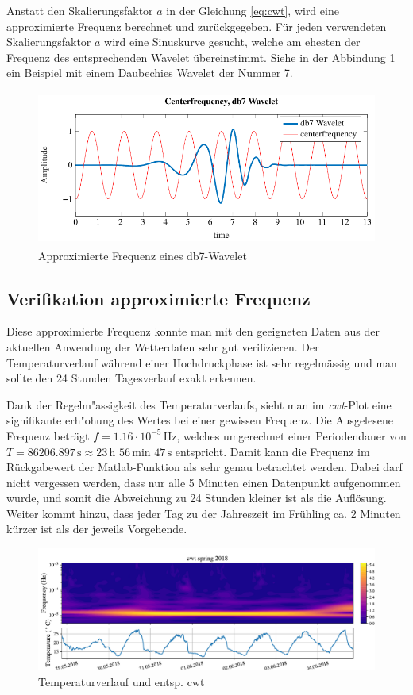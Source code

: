 \begin{refsection}
Anstatt den Skalierungsfaktor $a$ in der Gleichung \ref{eq:cwt}, wird eine approximierte Frequenz berechnet und zurückgegeben.
Für jeden verwendeten Skalierungsfaktor $a$ wird eine Sinuskurve gesucht, welche am ehesten der Frequenz des entsprechenden Wavelet übereinstimmt.
Siehe in der Abbindung \ref{fig:centerf} ein Beispiel mit einem Daubechies Wavelet der Nummer 7.
\begin{figure}
	\centering
	\includegraphics[width=1\textwidth, height=2in]{papers/wwt/images/centerf.pdf}
	\caption{Approximierte Frequenz eines db7-Wavelet}
	\label{fig:centerf}
\end{figure}


\newpage
\subsection{Verifikation approximierte Frequenz}
Diese approximierte Frequenz konnte man mit den geeigneten Daten aus der aktuellen Anwendung der Wetterdaten sehr gut verifizieren.
Der Temperaturverlauf während einer Hochdruckphase ist sehr regelmässig und man sollte den 24 Stunden Tagesverlauf exakt erkennen.

Dank der Regelm"assigkeit des Temperaturverlaufs, sieht man im \textit{cwt}-Plot eine signifikante erh"ohung des Wertes bei einer gewissen Frequenz.
Die Ausgelesene Frequenz beträgt $f = 1.16\cdot10^{-5} \,\text{Hz}$, welches umgerechnet einer Periodendauer von $T = 86206.897\,\text{s}\approx 23\,\text{h }56\,\text{min } 47\,\text{s}$ entspricht.
Damit kann die Frequenz im Rückgabewert der Matlab-Funktion als sehr genau betrachtet werden.
Dabei darf nicht vergessen werden, dass nur alle 5 Minuten einen Datenpunkt aufgenommen wurde, und somit die Abweichung zu 24 Stunden kleiner ist als die Auflösung.
Weiter kommt hinzu, dass jeder Tag zu der Jahreszeit im Frühling ca. 2 Minuten kürzer ist als der jeweils Vorgehende\cite{online:sunset_time}.

\begin{figure}[b]
	\centering
	\includegraphics[width=1\textwidth]{papers/wwt/images/data_spring.pdf}
	\caption{Temperaturverlauf und entsp. cwt}
	\label{fig:cwt_zoom}
\end{figure}





\end{refsection}
